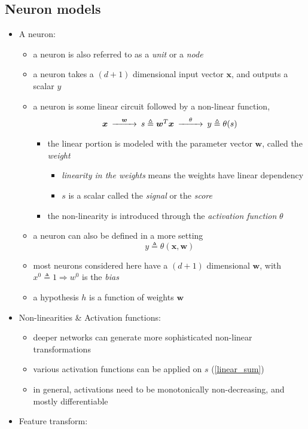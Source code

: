 \documentclass[onecolumn]{IEEEtran}
\newcommand{\beq}{\begin{equation}}
\newcommand{\eeq}{\end{equation}}
\newcommand{\bi}{\begin{itemize}}
\newcommand{\ei}{\end{itemize}}
\begin{document}
\subsection{Neuron models\label{neuron_section}}
\begin{itemize}
    \item A neuron:
    \bi
        \item a neuron is also referred to as a \emph{unit} or a \emph{node}
        \item a neuron takes a $(d+1)$ dimensional input vector $\bm{x}$, and outputs a scalar $y$
        \item a neuron is some linear circuit followed by a non-linear function,
        \beq\label{linear_sum}\begin{CD}
            \bm{x} @>\bm{w}>> s\triangleq \bm{w}^T \bm{x} @>\theta>> y \triangleq \theta(s)
        \end{CD}\eeq
        \bi
            \item the linear portion is modeled with the parameter vector $\bm{w}$, called the \emph{weight}
            \bi
                \item \emph{linearity in the weights} means the weights have linear dependency
                \item $s$ is a scalar called the \emph{signal} or the \emph{score}
            \ei
            \item the non-linearity is introduced through the \emph{activation function} $\theta$
        \ei
        \item a neuron can also be defined in a more setting
        \beq\label{activation_fn}
            y \triangleq \theta(\bm{x}, \bm{w})
        \eeq
        \item most neurons considered here have a $(d+1)$ dimensional $\bm{w}$, with $x^0 \triangleq 1 \Rightarrow w^0$ is the \emph{bias}
        \item a hypothesis $h$ is a function of weights $\bm{w}$
    \ei
    \item Non-linearities \& Activation functions:
    \bi
        \item deeper networks can generate more sophisticated non-linear transformations
        \item various activation functions can be applied on $s$ (\ref{linear_sum})
        \item in general, activations need to be monotonically non-decreasing, and mostly differentiable
    \ei
    \item Feature transform:

\end{itemize}
\end{document}
